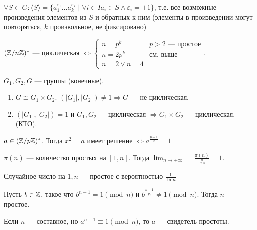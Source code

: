  \begin{theorem}
	 $\forall S \subset G\!: \langle S \rangle= \{a_1^{\varepsilon_1} \ldots a_k^{\varepsilon_k} \mid \forall i \in I a_i \in S \land \varepsilon_i = \pm 1\}$, т.е. все возможные произведения элементов из $S$ и обратных к ним (элементы в произведении могут повторяться, $k$ произвольное, не фиксировано)
 \end{theorem}
  \begin{theorem}
      $(\mathbb{Z} / n\mathbb{Z})^*$ --- циклическая  $\iff \begin{cases} n=p^k & p>2\text{ --- простое} \\ n = 2 p^k & \text{см. выше} \\ n = 2 \lor n = 4\end{cases}$.
 \end{theorem}
    \begin{statement}
    $G_1, G_2, G$ --- группы (конечные). 
    \begin{enumerate}
        \item $G \cong G_1 \times G_2$. $(|G_1|, |G_2|) \neq 1 \Rightarrow G$ --- не циклическая.
        \item $(|G_1|, |G_2|) = 1$ и $G_1, G_2$ --- циклическая $\Rightarrow G_1 \times G_2$ --- циклическая. (КТО).
    \end{enumerate}
    \end{statement}
\begin{theorem}
    $a \in (\mathbb{Z} / p \mathbb{Z})^*$. Тогда  $x^2 = a$ имеет решение  $\iff a^{\frac{p-1}{2}} = 1$
\end{theorem}
 \begin{theorem}
     $\pi(n)$ --- количество простых на  $[1, n]$. Тогда  $\lim_{n \to +\infty} = \frac{\pi(n)}{\frac{n}{\ln n}} = 1$.
\end{theorem}
\begin{consequence}
   Случайное число на $1, n$ --- простое с вероятностью  $\frac{1}{\ln n}$ 
\end{consequence}
\begin{theorem}
Пусть  $b \in \mathbb{Z}$, такое что  $b^{n-1}= 1 \pmod{n}$ и  $b^{\frac{n-1}{p_i}} \neq 1 \pmod{n}$. Тогда $n$ --- простое.
\end{theorem}
 \begin{definition}
     Если $n$ --- составное, но  $a^{n-1} \equiv 1 \pmod{n}$, то  $a$ --- свидетель простоты.
\end{definition}
